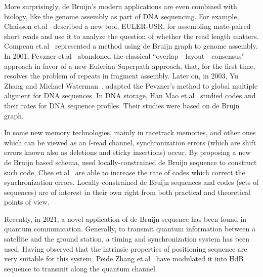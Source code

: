 More surprisingly, de Bruijn's modern applications are even combined with biology, like the genome assembly as part of DNA sequencing. For example, Chaisson et.al~\cite{chaisson2009novo} described a new tool, EULER-USR, for assembling mate-paired short reads and use it to analyze the question of whether the read length matters. Compeau et.al~\cite{compeau2011apply} represented a method using de Bruijn graph to genome assembly. In 2001, Pevzner et.al~\cite{pevzner2001new} abandoned the classical “overlap - layout - consensus” approach in favor of a new Eulerian Superpath approach, that, for the first time, resolves the problem of repeats in fragment assembly. Later on, in 2003, Yu Zhang and Michael Waterman~\cite{zhang2003eulerian}, adapted the Pevzner's method to global multiple aligment for DNA sequences. In DNA storage, Han Mao et.al~\cite{chang2017rates,kiah2016codes} studied codes and their rates for DNA sequence profiles. Their studies were based on de Brujn graph.

In some new memory technologies, mainly in racetrack memories, and other ones which can be viewed as an $l$-read channel, synchronization errors (which are shift errors known also as deletions and sticky insertions) occur. By proposing a new de Bruijn based schema, used locally-constrained de Bruijn sequence to construct such code, Chee et.al~\cite{chee2021locally} are able to increase the rate of codes which correct the synchronization errors. Locally-constrained de Bruijn sequences and codes (sets of sequences) are of interest in their own right from both practical and theoretical points of view.

Recently, in 2021, a novel application of de Bruijn sequence has been found in quantum communication. Generally, to transmit quantum information between a satellite and the ground station, a timing and synchronization system has been used. Having observed that the intrinsic properties of positioning sequence are very suitable for this system, Peide Zhang et.al~\cite{zhang2021timing} have modulated it into \gls{HdB} sequence to transmit along the quantum channel. %

